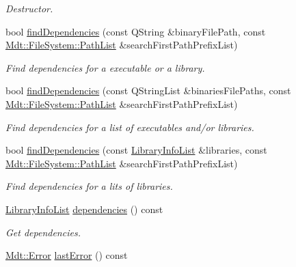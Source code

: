 \begin{DoxyCompactItemize}
\begin{DoxyCompactList}\small\item\em Destructor. \end{DoxyCompactList}\item 
bool \hyperlink{class_mdt_1_1_deploy_utils_1_1_binary_dependencies_a03ad6fc0e8f12cd3c24aabeee2d588f3}{find\+Dependencies} (const Q\+String \&binary\+File\+Path, const \hyperlink{class_mdt_1_1_file_system_1_1_path_list}{Mdt\+::\+File\+System\+::\+Path\+List} \&search\+First\+Path\+Prefix\+List)
\begin{DoxyCompactList}\small\item\em Find dependencies for a executable or a library. \end{DoxyCompactList}\item 
bool \hyperlink{class_mdt_1_1_deploy_utils_1_1_binary_dependencies_a2bd4e2c97510c0476250c166378f4c99}{find\+Dependencies} (const Q\+String\+List \&binaries\+File\+Paths, const \hyperlink{class_mdt_1_1_file_system_1_1_path_list}{Mdt\+::\+File\+System\+::\+Path\+List} \&search\+First\+Path\+Prefix\+List)
\begin{DoxyCompactList}\small\item\em Find dependencies for a list of executables and/or libraries. \end{DoxyCompactList}\item 
bool \hyperlink{class_mdt_1_1_deploy_utils_1_1_binary_dependencies_ad4195018b760f891a831b463f71e4582}{find\+Dependencies} (const \hyperlink{class_mdt_1_1_deploy_utils_1_1_library_info_list}{Library\+Info\+List} \&libraries, const \hyperlink{class_mdt_1_1_file_system_1_1_path_list}{Mdt\+::\+File\+System\+::\+Path\+List} \&search\+First\+Path\+Prefix\+List)
\begin{DoxyCompactList}\small\item\em Find dependencies for a lits of libraries. \end{DoxyCompactList}\item 
\hyperlink{class_mdt_1_1_deploy_utils_1_1_library_info_list}{Library\+Info\+List} \hyperlink{class_mdt_1_1_deploy_utils_1_1_binary_dependencies_a53e68f923a4c13493eba8990eaf6b5ef}{dependencies} () const \hypertarget{class_mdt_1_1_deploy_utils_1_1_binary_dependencies_a53e68f923a4c13493eba8990eaf6b5ef}{}\label{class_mdt_1_1_deploy_utils_1_1_binary_dependencies_a53e68f923a4c13493eba8990eaf6b5ef}

\begin{DoxyCompactList}\small\item\em Get dependencies. \end{DoxyCompactList}\item 
\hyperlink{class_mdt_1_1_error}{Mdt\+::\+Error} \hyperlink{class_mdt_1_1_deploy_utils_1_1_binary_dependencies_ada341a03a0f42c02cf0d23f82e21f58e}{last\+Error} () const \hypertarget{class_mdt_1_1_deploy_utils_1_1_binary_dependencies_ada341a03a0f42c02cf0d23f82e21f58e}{}\label{class_mdt_1_1_deploy_utils_1_1_binary_dependencies_ada341a03a0f42c02cf0d23f82e21f58e}


\end{DoxyCompactItemize}
